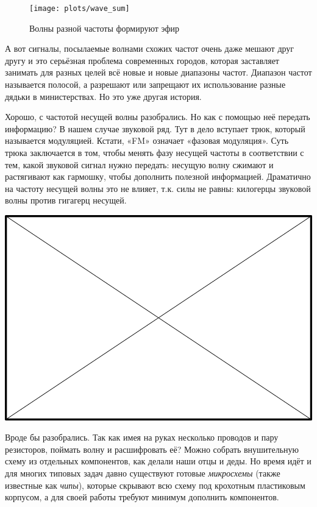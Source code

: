 \begin{figure}
  \centering
  \texttt{[image: plots/wave\_sum]}
  \caption{Волны разной частоты формируют эфир}
\end{figure}

\begin{Note}
  А вот сигналы, посылаемые волнами схожих частот очень даже мешают друг другу и это серьёзная проблема современных городов, которая заставляет занимать для разных целей всё новые и новые диапазоны частот. Диапазон частот называется полосой, а разрешают или запрещают их использование разные дядьки в министерствах. Но это уже другая история.
\end{Note}

Хорошо, с частотой несущей волны разобрались. Но как с помощью неё передать информацию? В нашем случае звуковой ряд. Тут в дело вступает трюк, который называется модуляцией. Кстати, «FM» означает «фазовая модуляция». Суть трюка заключается в том, чтобы менять фазу несущей частоты в соответствии с тем, какой звуковой сигнал нужно передать: несущую волну сжимают и растягивают как гармошку, чтобы дополнить полезной информацией. Драматично на частоту несущей волны это не влияет, т.к. силы не равны: килогерцы звуковой волны против гигагерц несущей.

\includegraphics{TODO.png}

Вроде бы разобрались. Так как имея на руках несколько проводов и пару резисторов, поймать волну и расшифровать её? Можно собрать внушительную схему из отдельных компонентов, как делали наши отцы и деды. Но время идёт и для многих типовых задач давно существуют готовые \emph{микросхемы} (также известные как \emph{чипы}), которые скрывают всю схему под крохотным пластиковым корпусом, а для своей работы требуют минимум дополнить компонентов.

